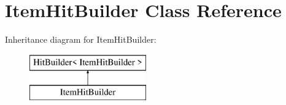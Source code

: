 \hypertarget{class_item_hit_builder}{}\section{Item\+Hit\+Builder Class Reference}
\label{class_item_hit_builder}
Inheritance diagram for Item\+Hit\+Builder\+:\begin{figure}[H]
\begin{center}
\leavevmode
\includegraphics[height=2.000000cm]{class_item_hit_builder}
\end{center}
\end{figure}
